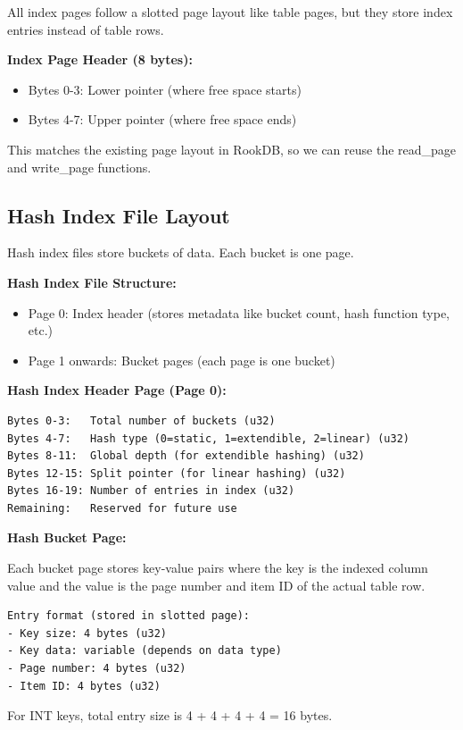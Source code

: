 \documentclass[11pt,a4paper]{article}
\begin{document}
All index pages follow a slotted page layout like table pages, but they store index entries instead of table rows.

\textbf{Index Page Header (8 bytes):}
\begin{itemize}
\item Bytes 0-3: Lower pointer (where free space starts)
\item Bytes 4-7: Upper pointer (where free space ends)
\end{itemize}

This matches the existing page layout in RookDB, so we can reuse the read\_page and write\_page functions.

\subsection{Hash Index File Layout}

Hash index files store buckets of data. Each bucket is one page.

\textbf{Hash Index File Structure:}
\begin{itemize}
\item Page 0: Index header (stores metadata like bucket count, hash function type, etc.)
\item Page 1 onwards: Bucket pages (each page is one bucket)
\end{itemize}

\textbf{Hash Index Header Page (Page 0):}
\begin{lstlisting}
Bytes 0-3:   Total number of buckets (u32)
Bytes 4-7:   Hash type (0=static, 1=extendible, 2=linear) (u32)
Bytes 8-11:  Global depth (for extendible hashing) (u32)
Bytes 12-15: Split pointer (for linear hashing) (u32)
Bytes 16-19: Number of entries in index (u32)
Remaining:   Reserved for future use
\end{lstlisting}

\textbf{Hash Bucket Page:}

Each bucket page stores key-value pairs where the key is the indexed column value and the value is the page number and item ID of the actual table row.

\begin{lstlisting}
Entry format (stored in slotted page):
- Key size: 4 bytes (u32)
- Key data: variable (depends on data type)
- Page number: 4 bytes (u32)
- Item ID: 4 bytes (u32)
\end{lstlisting}

For INT keys, total entry size is 4 + 4 + 4 + 4 = 16 bytes.
\end{document}
